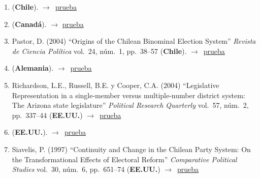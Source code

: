 \documentclass[12 pt, letter]{article}
\newenvironment{CitasMiTrabajo}{
    \begin{footnotesize}
    \begin{enumerate}[label={\footnotesize\emph{cita~\arabic*}},ref=\arabic*] %
        \setlength{\itemsep}{.1\itemsep}
        \setlength{\parskip}{.1\parskip}
    }{\end{enumerate}\end{footnotesize}}
\begin{document}
\begin{CitasMiTrabajo}
        \item {} (\textbf{Chile}). $\rightarrow$~\href{http://www.scielo.org.mx/scielo.php?pid=S1405-10792012000100005&script=sci_abstract&tlng=en}{prueba}
        
        \item {} (\textbf{Canad\'a}). $\rightarrow$ \href{https://www.cambridge.org/core/journals/canadian-journal-of-political-science-revue-canadienne-de-science-politique/article/its-the-christian-democrats-fault-declining-political-identification-in-chile-19572012/E13848612D0A6D6EB43DF3691B0FBA05}{prueba}
        
        \item Pastor, D. (2004)
        ``Origins of the Chilean Binominal Election System''
        \emph{Revista de Ciencia Pol\'itica} vol.\ 24, n\'um.\ 1, pp.\ 38--57
        (\textbf{Chile}). $\rightarrow$~\href{https://github.com/emagar/cv/blob/master/citasMiTrab/mrs/pastor2004rcp.pdf}{prueba}


        \item {} (\textbf{Alemania}). $\rightarrow$~\href{https://www.tandfonline.com/doi/ref/10.1080/13572334.2019.1603207?scroll=top}{prueba}

        \item Richardson, L.E., Russell, B.E. y Cooper, C.A. (2004)
        ``Legislative
        Representation in a single-member versus multiple-number district system:
        The Arizona state legislature'' \emph{Political Research Quarterly} vol.\ 57, n\'um.\ 2,
        pp.\ 337--44 (\textbf{EE.UU.}) $\rightarrow$~\href{https://github.com/emagar/cv/blob/master/citasMiTrab/mrs/richEtal.pdf}{prueba}

        \item {} (\textbf{EE.UU.}). $\rightarrow$~\href{https://onlinelibrary.wiley.com/doi/full/10.1111/lsq.12153?casa_token=S0uOmRb5GksAAAAA%3A7QFbgurL9wQ2Eb6U4mwDMBVT679An0VfZ357xfu5WSwrndg20jdzB4_uqcqtDwqHkVhVGqYS9iTQiQCtJQ}{prueba}
        
        \item Siavelis, P. (1997)
        ``Continuity and Change in the Chilean Party System: On the Transformational Effects of Electoral
        Reform''
        \emph{Comparative Political Studies} vol.\ 30, n\'um.\ 6, pp.\ 651--74
        (\textbf{EE.UU.}) $\rightarrow$~\href{https://github.com/emagar/cv/blob/master/citasMiTrab/mrs/siavelis97.pdf}{prueba}


\end{CitasMiTrabajo}
\end{document}
